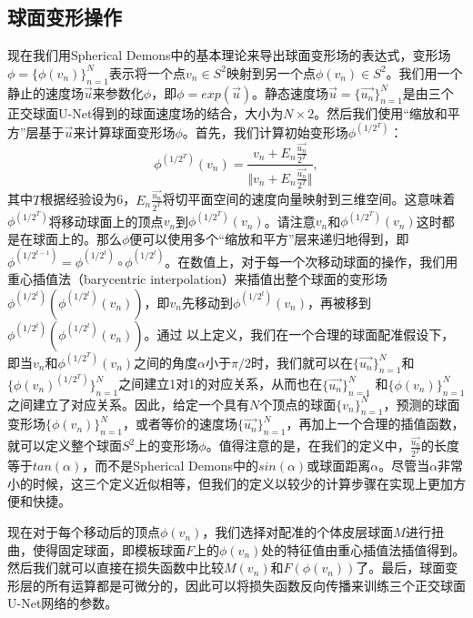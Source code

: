 \subsection{球面变形操作}\label{sec:球面变形层}
现在我们用Spherical Demons\cite{yeo2009spherical}中的基本理论来导出球面变形场的表达式，变形场$\phi=\{\phi(v_n)\}_{n=1}^N$表示将一个点$v_n\in S^2 $映射到另一个点$\phi(v_n)\in S^2$。我们用一个静止的速度场$\overrightarrow{u}$来参数化$\phi$，即$\phi=exp(\overrightarrow{u})$。静态速度场$\overrightarrow{u}=\{\overrightarrow{u_n}\}_{n=1}^N$是由三个正交球面U-Net得到的球面速度场的结合，大小为$N\times2$。然后我们使用“缩放和平方”层基于$\overrightarrow{u}$来计算球面变形场$\phi$。首先，我们计算初始变形场$\phi^{(1/2^T)}$：
\begin{equation}
\phi^{(1/2^T)}(v_n)=\frac{v_n+E_n\frac{\overrightarrow{u_n}}{2^T}}{\Vert v_n+E_n\frac{\overrightarrow{u_n}}{2^T} \Vert}, 
\end{equation}
其中$T$根据经验设为6，$E_n \frac{\overrightarrow{u_n}}{2^T}$将切平面空间的速度向量映射到三维空间。这意味着$\phi^{(1/2^T)}$将移动球面上的顶点$v_n$到$\phi^{(1/2^T)}(v_n)$。请注意$v_n$和$\phi^{(1/2^T)}(v_n)$这时都是在球面上的。那么$\phi$便可以使用多个“缩放和平方”层来递归地得到，即$\phi^{(1/2^{t-1})}=\phi^{(1/2^t)}\circ\phi^{(1/2^t)}$。在数值上，对于每一个次移动球面的操作，我们用重心插值法（barycentric interpolation）来插值出整个球面的变形场$\phi^{(1/2^t)}(\phi^{(1/2^t)}(v_n))$，即$v_n$先移动到$\phi^{(1/2^t)}(v_n)$，再被移到$\phi^{(1/2^t)}(\phi^{(1/2^t)}(v_n))$。通过
以上定义，我们在一个合理的球面配准假设下，即当$v_n$和$\phi^{(1/2^T)}(v_n)$之间的角度$\alpha$小于$\pi/2$时，我们就可以在$\{\overrightarrow{u_n}\}_{n=1}^N$和$\{\phi(v_n)^{(1/2^T)}\}_{n=1}^N$之间建立1对1的对应关系，从而也在$\{\overrightarrow{u_n}\}_{n=1}^N$ 和$\{\phi(v_n)\}_{n=1}^N$之间建立了对应关系。因此，给定一个具有$N$个顶点的球面$\{{v_n}\}_{n=1}^N$，预测的球面变形场$\{\phi(v_n)\}_{n=1}^N$，或者等价的速度场$\{\overrightarrow{u_n}\}_{n=1}^N$，再加上一个合理的插值函数，就可以定义整个球面$S^2$上的变形场$\phi$。值得注意的是，在我们的定义中，$\frac{\overrightarrow{u_n}}{2^T}$的长度等于$tan(\alpha)$，而不是Spherical Demons中的$sin(\alpha)$或球面距离$\alpha$。尽管当$\alpha$非常小的时候，这三个定义近似相等，但我们的定义以较少的计算步骤在实现上更加方便和快捷。

现在对于每个移动后的顶点$\phi(v_n)$，我们选择对配准的个体皮层球面$M$进行扭曲，使得固定球面，即模板球面$F$上的$\phi(v_n)$处的特征值由重心插值法插值得到。然后我们就可以直接在损失函数中比较$M(v_n)$和$F(\phi(v_n))$了。最后，球面变形层的所有运算都是可微分的，因此可以将损失函数反向传播来训练三个正交球面U-Net网络的参数。


